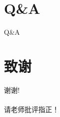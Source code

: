 \documentclass{beamer}
\begin{document}




\section*{Q\&A}
\begin{frame}
	\begin{center}
		\textcolor{myNewColorA}{\huge {Q\&A}}
	\end{center}
\end{frame}


	\section*{致谢}  
	\begin{frame}
		\begin{center}
			\textcolor{myNewColorA}{\huge {谢谢!\\ \quad \\ 请老师批评指正！}}
		\end{center}
	\end{frame}
	
\end{document}
